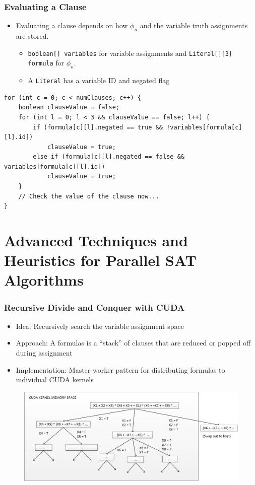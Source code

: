 \documentclass[handout,10pt]{beamer}
\begin{document}
\begin{frame}[fragile]
	\frametitle{Evaluating a Clause}
\begin{itemize}
	\item Evaluating a clause depends on how $\phi_n$ and the variable truth assignments are stored.
	\begin{itemize}
		\item {\tt boolean[] variables} for variable assignments and {\tt Literal[][3] formula} for $\phi_n$.
		\item A {\tt Literal} has a variable ID and negated flag
	\end{itemize}
\end{itemize}
{\small
\begin{lstlisting}
for (int c = 0; c < numClauses; c++) {
    boolean clauseValue = false;
    for (int l = 0; l < 3 && clauseValue == false; l++) {
        if (formula[c][l].negated == true && !variables[formula[c][l].id])
            clauseValue = true;
        else if (formula[c][l].negated == false && variables[formula[c][l].id])
            clauseValue = true; 
    }
    // Check the value of the clause now...
}
\end{lstlisting}
}
\end{frame}

\section{Advanced Techniques and Heuristics for Parallel SAT Algorithms}
\begin{frame}
	\frametitle{Recursive Divide and Conquer with CUDA}
	\begin{itemize}
		\item Idea: Recursively search the variable assignment space
		\item Approach: A formulas is a ``stack'' of clauses that are reduced or popped off during assignment 
		\item Implementation: Master-worker pattern for distributing formulas to individual CUDA kernels
	\end{itemize}
\begin{figure}
\centering
\includegraphics[scale = 0.30]{satDCswap.jpg}
\end{figure}
\end{frame}
\end{document}
